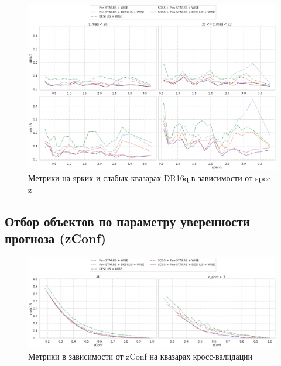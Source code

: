 \documentclass[fleqn,usenatbib]{mnras}
\begin{document}
\begin{figure}
    \centering
    \includegraphics[width=0.99\linewidth]{images/class-qso-dr16q.png}
    \caption{Метрики на ярких и слабых квазарах DR16q в зависимости от spec-z}
    \label{fig:class-qso-dr16q}
\end{figure}


\subsection{Отбор объектов по параметру уверенности прогноза (zConf)}

\begin{figure}
    \centering
    \includegraphics[width=0.99\linewidth]{images/metrics-by-zconf-cv2-qso.png}
    \caption{Метрики в зависимости от zConf на квазарах кросс-валидации}
    \label{fig:metrics-zconf-cv2}
\end{figure}
\end{document}
